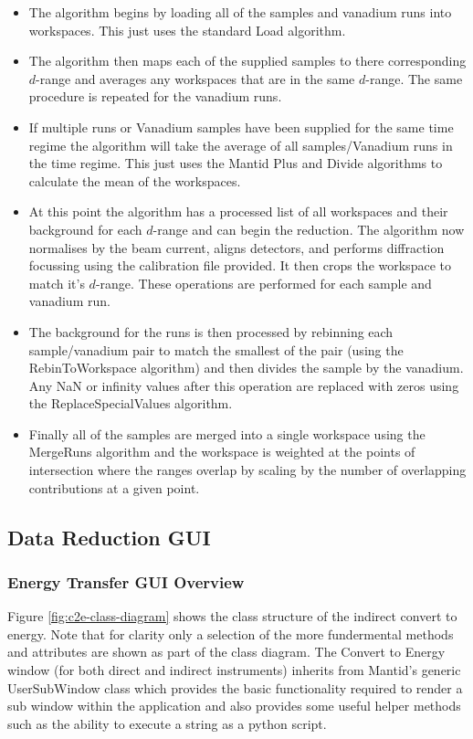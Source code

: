 \documentclass[paper=a4, fontsize=11pt]{scrartcl}	%
\numberwithin{equation}{section}															%
\numberwithin{figure}{section}																%
\numberwithin{table}{section}																%
\begin{document}
\begin{itemize}
\item The algorithm begins by loading all of the samples and vanadium runs into workspaces. This just uses the standard Load algorithm.

\item The algorithm then maps each of the supplied samples to there corresponding $d$-range and averages any workspaces that are in the same $d$-range. The same procedure is repeated for the vanadium runs.

\item If multiple runs or Vanadium samples have been supplied for the same time regime the algorithm will take the average of all samples/Vanadium runs in the time regime. This just uses the Mantid Plus and Divide algorithms to calculate the mean of the workspaces. 

\item At this point the algorithm has a processed list of all workspaces and their background for each $d$-range and can begin the reduction. The algorithm now normalises by the beam current, aligns detectors, and performs diffraction focussing using the calibration file provided. It then crops the workspace to match it's $d$-range. These operations are performed for each sample and vanadium run.

\item The background for the runs is then processed by rebinning each sample/vanadium pair to match the smallest of the pair (using the RebinToWorkspace algorithm) and then divides the sample by the vanadium. Any NaN or infinity values after this operation are replaced with zeros using the ReplaceSpecialValues algorithm.

\item Finally all of the samples are merged into a single workspace using the MergeRuns algorithm and the workspace is weighted at the points of intersection where the ranges overlap by scaling by the number of overlapping contributions at a given point.
\end{itemize}

\subsection{Data Reduction GUI}

\subsubsection{Energy Transfer GUI Overview}
\label{subsec:c2e-gui-overview}
Figure \ref{fig:c2e-class-diagram} shows the class structure of the indirect convert to energy. Note that for clarity only a selection of the more fundermental methods and attributes are shown as part of the class diagram. The Convert to Energy window (for both direct and indirect instruments) inherits from Mantid's generic UserSubWindow class which provides the basic functionality required to render a sub window within the application and also provides some useful helper methods such as the ability to execute a string as a python script.
\end{document}
